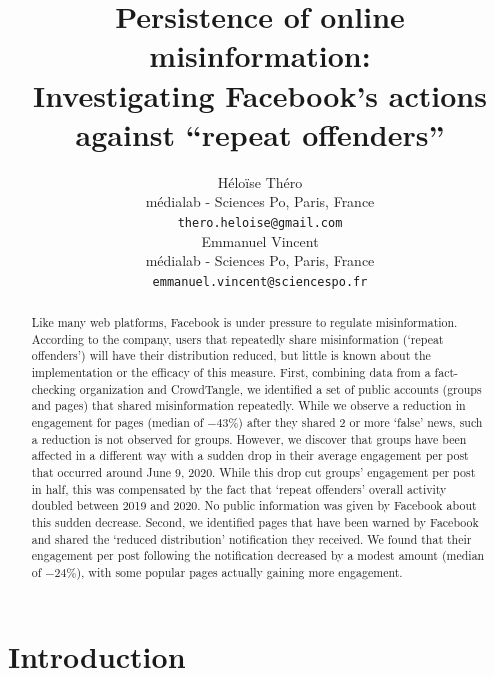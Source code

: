 \documentclass[11pt,a4paper]{article}
\title{Persistence of online misinformation: \\ Investigating Facebook's actions against ``repeat offenders''}
\author{Héloïse Théro \\
  médialab - Sciences Po, Paris, France \\
  \texttt{thero.heloise@gmail.com} \\\And
  Emmanuel Vincent \\
  médialab - Sciences Po, Paris, France \\
  \texttt{emmanuel.vincent@sciencespo.fr} \\}
\date{}
\begin{document}
\maketitle

\begin{abstract}
Like many web platforms, Facebook is under pressure to regulate misinformation. 
According to the company, users that repeatedly share misinformation (`repeat offenders') will have their distribution reduced, but little is known about the implementation or the efficacy of this measure.
First, combining data from a fact-checking organization and CrowdTangle, we identified a set of public accounts (groups and pages) that shared misinformation repeatedly. While we observe a reduction in engagement for pages (median of $-43\%$) after they shared 2 or more `false' news, such a reduction is not observed for groups. However, we discover that groups have been affected in a different way with a sudden drop in their average engagement per post that occurred around June 9, 2020. While this drop cut groups’ engagement per post in half, this was compensated by the fact that `repeat offenders' overall activity doubled between 2019 and 2020.
No public information was given by Facebook about this sudden decrease.
Second, we identified pages that have been warned by Facebook and shared the `reduced distribution' notification they received. 
We found that their engagement per post following the notification decreased by a modest amount (median of $-24\%$), with some popular pages actually gaining more engagement.
\end{abstract}

\section{Introduction}
\end{document}
